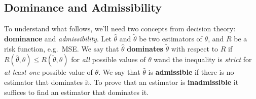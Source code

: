 \subsection{Dominance and Admissibility}
To understand what follows, we'll need two concepts from decision theory: \textbf{dominance} and \emph{admissibility}. 
Let $\widehat{\theta}$ and $\widetilde{\theta}$ be two estimators of $\theta$, and $R$ be a risk function, e.g.\ MSE.
We say that $\widehat{\theta}$ \textbf{dominates} $\widetilde{\theta}$ with respect to $R$ if $R(\widehat{\theta},\theta) \leq R(\widetilde{\theta},\theta)$ for \emph{all} possible values of $\theta$ wand the inequality is \emph{strict} for \emph{at least one} possible value of $\theta$.
We say that $\widehat{\theta}$ is \textbf{admissible} if there is no estimator that dominates it.
To prove that an estimator is \textbf{inadmissible} it suffices to find an estimator that dominates it.


